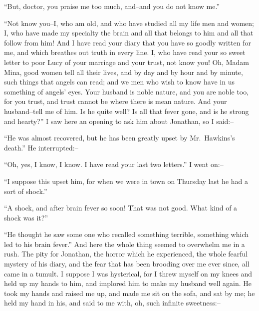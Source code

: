 \documentclass[12pt,openright]{book}
\begin{document}
“But, doctor, you praise me too much, and–and you do not know me.”

“Not know you–I, who am old, and who have studied all my life men and women; I, who have made my specialty the brain and all that belongs to him and all that follow from him! And I have read your diary that you have so goodly written for me, and which breathes out truth in every line. I, who have read your so sweet letter to poor Lucy of your marriage and your trust, not know you! Oh, Madam Mina, good women tell all their lives, and by day and by hour and by minute, such things that angels can read; and we men who wish to know have in us something of angels’ eyes. Your husband is noble nature, and you are noble too, for you trust, and trust cannot be where there is mean nature. And your husband–tell me of him. Is he quite well? Is all that fever gone, and is he strong and hearty?” I saw here an opening to ask him about Jonathan, so I said:–

“He was almost recovered, but he has been greatly upset by Mr. Hawkins’s death.” He interrupted:–

“Oh, yes, I know, I know. I have read your last two letters.” I went on:–

“I suppose this upset him, for when we were in town on Thursday last he had a sort of shock.”

“A shock, and after brain fever so soon! That was not good. What kind of a shock was it?”

“He thought he saw some one who recalled something terrible, something which led to his brain fever.” And here the whole thing seemed to overwhelm me in a rush. The pity for Jonathan, the horror which he experienced, the whole fearful mystery of his diary, and the fear that has been brooding over me ever since, all came in a tumult. I suppose I was hysterical, for I threw myself on my knees and held up my hands to him, and implored him to make my husband well again. He took my hands and raised me up, and made me sit on the sofa, and sat by me; he held my hand in his, and said to me with, oh, such infinite sweetness:–
\end{document}
